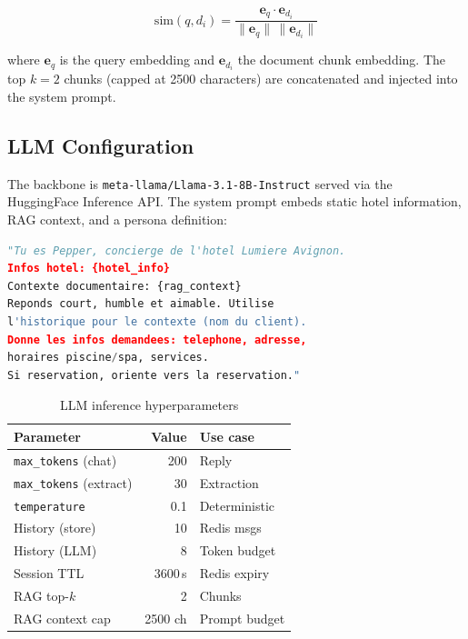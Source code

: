 \documentclass[a4paper]{article}
\begin{document}
\begin{equation}
  \text{sim}(q, d_i) = \frac{\mathbf{e}_q \cdot \mathbf{e}_{d_i}}{\|\mathbf{e}_q\|\,\|\mathbf{e}_{d_i}\|}
  \label{eq:cosine}
\end{equation}

where $\mathbf{e}_q$ is the query embedding and $\mathbf{e}_{d_i}$ the document chunk embedding. The top $k=2$ chunks (capped at 2500 characters) are concatenated and injected into the system prompt.

\subsection{LLM Configuration}

The backbone is \texttt{meta-llama/Llama-3.1-8B\allowbreak-Instruct} served via the HuggingFace Inference API. The system prompt embeds static hotel information, RAG context, and a persona definition:

\begin{lstlisting}[language=Python, caption={System prompt template (condensed)}]
"Tu es Pepper, concierge de l'hotel Lumiere Avignon.
Infos hotel: {hotel_info}
Contexte documentaire: {rag_context}
Reponds court, humble et aimable. Utilise
l'historique pour le contexte (nom du client).
Donne les infos demandees: telephone, adresse,
horaires piscine/spa, services.
Si reservation, oriente vers la reservation."
\end{lstlisting}

\begin{table}[th]
  \caption{LLM inference hyperparameters}
  \label{tab:llm_params}
  \centering
  \small
  \begin{tabular}{p{28mm}rp{17mm}}
    \toprule
    \textbf{Parameter} & \textbf{Value} & \textbf{Use case} \\
    \midrule
    \texttt{max\_tokens} (chat)    & 200     & Reply \\
    \texttt{max\_tokens} (extract) & 30      & Extraction \\
    \texttt{temperature}           & 0.1     & Deterministic \\
    History (store)                & 10      & Redis msgs \\
    History (LLM)                  & 8       & Token budget \\
    Session TTL                    & 3600\,s & Redis expiry \\
    RAG top-$k$                    & 2       & Chunks \\
    RAG context cap                & 2500 ch & Prompt budget \\
    \bottomrule
  \end{tabular}
\end{table}
\end{document}
